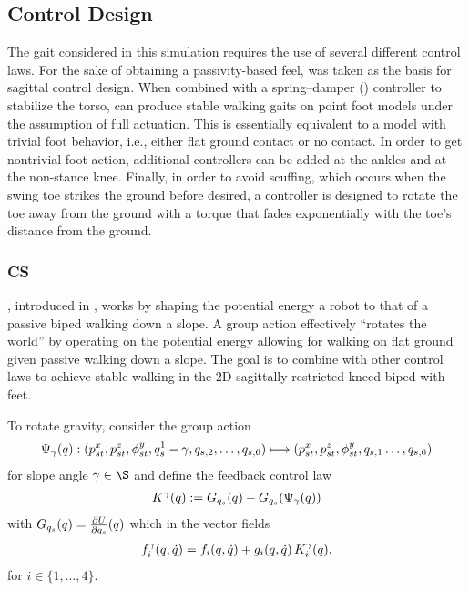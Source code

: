 \subsection{Control Design}

The gait considered in this simulation requires the use of several different
control laws.
% 
For the sake of obtaining a passivity-based feel, \csx was taken as the basis
for sagittal control design.
% 
When combined with a spring--damper (\PD) controller to stabilize the torso,
\csx can produce stable walking gaits on point foot models under the assumption
of full actuation.
% 
This is essentially equivalent to a model with trivial foot behavior, i.e.,
either flat ground contact or no contact.
% 
In order to get nontrivial foot action, additional \PDx controllers can be added
at the ankles and at the non-stance knee.
% 
Finally, in order to avoid scuffing, which occurs when the swing toe strikes the
ground before desired, a controller is designed to rotate the toe away from the
ground with a torque that fades exponentially with the toe's distance from the
ground.

\subsubsection{CS}
\Cs, introduced in \cite{Spong2005}, works by shaping the potential energy a robot
to that of a passive biped walking down a slope.
% 
A group action effectively ``rotates the world'' by operating on the potential
energy allowing for walking on flat ground given passive walking down a slope.
% 
The goal is to combine \csx with other control laws to achieve stable walking in
the 2D sagittally-restricted kneed biped with feet.

To rotate gravity, consider the group action
\begin{align*}
  \Psi_\gamma(q) : (p_{st}^x, p_{st}^z, \phi_{st}^{y},
  q_{s}^{1} - \gamma, q_{s,2}, \ldots, q_{s,6}) \longmapsto (p_{st}^x, p_{st}^z,
  \phi_{st}^{y}, q_{s,1} \ldots, q_{s,6})
\end{align*}
for slope angle $\gamma \in \S$ and define the feedback control law
\begin{align*}
  K^{\gamma}(q):= G_{q_{s}}(q) - G_{q_{s}}(\Psi_{\gamma}(q))
\end{align*}
with $G_{q_{s}}(q) = \frac{\partial{U}}{\partial{q_{s}}}(q)$ which in the vector fields
\begin{align}
  \label{eq:frig}
  f_{i}^{\gamma}(q, \dot{q}) = f_{i}(q, \dot{q}) + g_{i}(q, \dot{q}) \, K^{\gamma}_{i}(q),
\end{align}
for $i \in \{1, \ldots, 4\}$.


